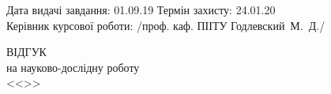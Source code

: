 {\begin{titlepage}
	\vspace*{\fill}

	\noindent
	Дата видачі завдання: 01.09.19 \hfill Термін захисту: 24.01.20 \\
	Керівник курсової роботи: \hfill /проф. каф. ПІІТУ Годлевский~М.~Д./
\end{titlepage}
}

\begin{titlepage}
\begin{center}
	\MakeUppercase{Відгук} \\
	на науково-дослідну роботу \\
	<<\thetitle>>
\end{center}
\end{titlepage}

\begin{titlepage}

\end{titlepage}

\begin{titlepage}

\end{titlepage}
